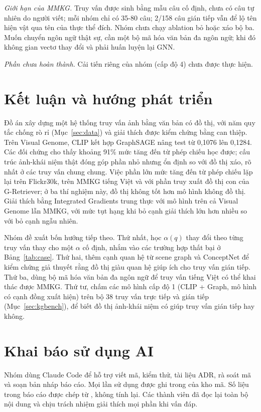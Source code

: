 \textit{Giới hạn của MMKG.} Truy vấn được sinh bằng mẫu câu cố định, chưa có câu tự nhiên do người viết; mỗi nhóm chỉ có 35-80 câu; 2/158 câu gián tiếp vẫn để lộ tên hiện vật qua tên của thực thể đích. Nhóm chưa chạy ablation bỏ hoặc xáo bộ ba. Muốn chuyển ngôn ngữ thật sự, cần một bộ mã hóa văn bản đa ngôn ngữ; khi đó không gian vectơ thay đổi và phải huấn luyện lại GNN.

\textit{Phần chưa hoàn thành.} Cải tiến riêng của nhóm (cấp độ 4) chưa được thực hiện.

\section{Kết luận và hướng phát triển}
\label{sec:conclusion}
Đồ án xây dựng một hệ thống truy vấn ảnh bằng văn bản có đồ thị, với năm quy tắc chống rò rỉ (Mục~\ref{sec:data}) và giải thích được kiểm chứng bằng can thiệp. Trên Visual Genome, CLIP kết hợp GraphSAGE nâng \mrr{} test từ 0,1076 lên 0,1284. Các đối chứng cho thấy khoảng 91\% mức tăng đến từ phép chiếu học được; cấu trúc ảnh-khái niệm thật đóng góp phần nhỏ nhưng ổn định so với đồ thị xáo, rõ nhất ở các truy vấn chung chung. Việc phần lớn mức tăng đến từ phép chiếu lặp lại trên Flickr30k, trên MMKG tiếng Việt và với phần truy xuất đồ thị con của G-Retriever; ở ba thí nghiệm này, đồ thị không tốt hơn mô hình không đồ thị. Giải thích bằng Integrated Gradients trung thực với mô hình trên cả Visual Genome lẫn MMKG, với mức tụt hạng khi bỏ cạnh giải thích lớn hơn nhiều so với bỏ cạnh ngẫu nhiên.

Nhóm đề xuất bốn hướng tiếp theo. Thứ nhất, học $\alpha(q)$ thay đổi theo từng truy vấn thay cho một $\alpha$ cố định, nhắm vào các trường hợp thất bại ở Bảng~\ref{tab:case}. Thứ hai, thêm cạnh quan hệ từ scene graph và ConceptNet để kiểm chứng giả thuyết rằng đồ thị giàu quan hệ giúp ích cho truy vấn gián tiếp. Thứ ba, dùng bộ mã hóa văn bản đa ngôn ngữ để truy vấn tiếng Việt có thể khai thác được MMKG. Thứ tư, chấm các mô hình cấp độ 1 (CLIP + Graph, mô hình có cạnh đồng xuất hiện) trên bộ 38 truy vấn trực tiếp và gián tiếp (Mục~\ref{sec:kgbench}), để biết đồ thị ảnh-khái niệm có giúp truy vấn gián tiếp hay không.

\section*{Khai báo sử dụng AI}
Nhóm dùng Claude Code để hỗ trợ viết mã, kiểm thử, tài liệu ADR, rà soát mã và soạn bản nháp báo cáo. Mọi lần sử dụng được ghi trong  của kho mã. Số liệu trong báo cáo được chép từ , không tính lại. Các thành viên đã đọc lại toàn bộ nội dung và chịu trách nhiệm giải thích mọi phần khi vấn đáp.
